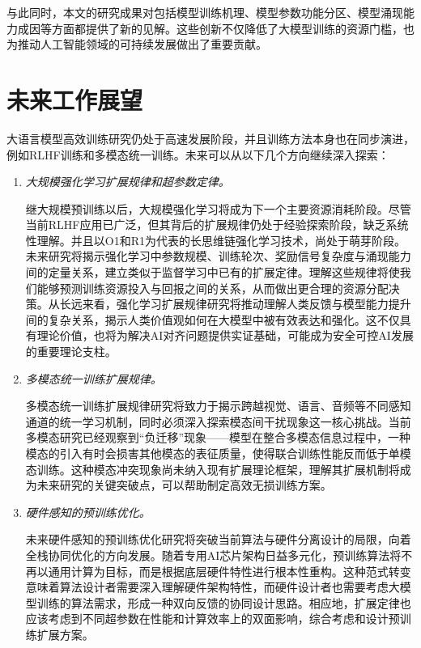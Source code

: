 与此同时，本文的研究成果对包括模型训练机理、模型参数功能分区、模型涌现能力成因等方面都提供了新的见解。这些创新不仅降低了大模型训练的资源门槛，也为推动人工智能领域的可持续发展做出了重要贡献。

\section{未来工作展望}

大语言模型高效训练研究仍处于高速发展阶段，并且训练方法本身也在同步演进，例如RLHF训练和多模态统一训练。未来可以从以下几个方向继续深入探索：

\begin{enumerate}

\item \textit{大规模强化学习扩展规律和超参数定律。} 

继大规模预训练以后，大规模强化学习将成为下一个主要资源消耗阶段。尽管当前RLHF应用已广泛，但其背后的扩展规律仍处于经验探索阶段，缺乏系统性理解。并且以O1\cite{openai2024learningtoreason}和R1\cite{guo2025deepseek}为代表的长思维链强化学习技术，尚处于萌芽阶段。未来研究将揭示强化学习中参数规模、训练轮次、奖励信号复杂度与涌现能力间的定量关系，建立类似于监督学习中已有的扩展定律。理解这些规律将使我们能够预测训练资源投入与回报之间的关系，从而做出更合理的资源分配决策。从长远来看，强化学习扩展规律研究将推动理解人类反馈与模型能力提升间的复杂关系，揭示人类价值观如何在大模型中被有效表达和强化。这不仅具有理论价值，也将为解决AI对齐问题提供实证基础，可能成为安全可控AI发展的重要理论支柱。

\item \textit{多模态统一训练扩展规律。} 

多模态统一训练扩展规律研究将致力于揭示跨越视觉、语言、音频等不同感知通道的统一学习机制，同时必须深入探索模态间干扰现象这一核心挑战。当前多模态研究已经观察到“负迁移”现象——模型在整合多模态信息过程中，一种模态的引入有时会损害其他模态的表征质量，使得联合训练性能反而低于单模态训练。这种模态冲突现象尚未纳入现有扩展理论框架，理解其扩展机制将成为未来研究的关键突破点，可以帮助制定高效无损训练方案。

\item \textit{硬件感知的预训练优化。} 

未来硬件感知的预训练优化研究将突破当前算法与硬件分离设计的局限，向着全栈协同优化的方向发展。随着专用AI芯片架构日益多元化，预训练算法将不再以通用计算为目标，而是根据底层硬件特性进行根本性重构。这种范式转变意味着算法设计者需要深入理解硬件架构特性，而硬件设计者也需要考虑大模型训练的算法需求，形成一种双向反馈的协同设计思路。相应地，扩展定律也应该考虑到不同超参数在性能和计算效率上的双面影响，综合考虑和设计预训练扩展方案。


\end{enumerate}
